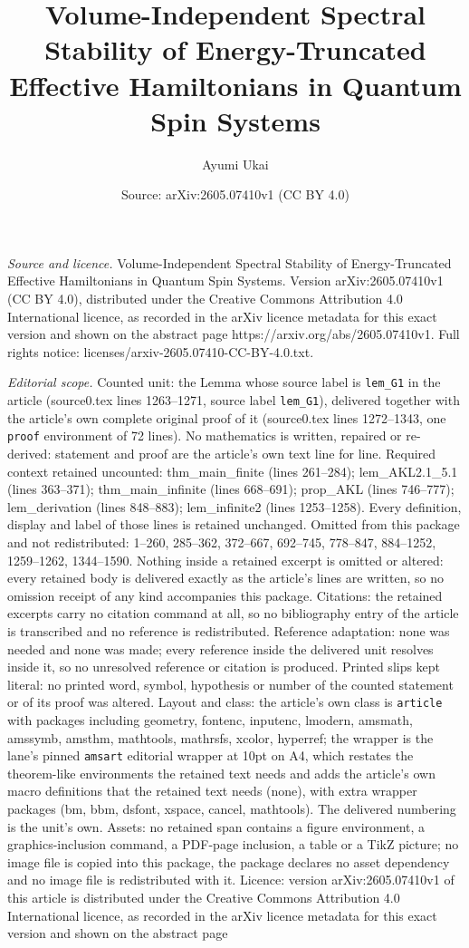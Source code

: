 \documentclass[10pt,a4paper]{amsart}
\title[Volume-Independent Spectral Stability of Energy-Truncated Ef]{Volume-Independent Spectral Stability of Energy-Truncated Effective Hamiltonians in Quantum Spin Systems}
\author{Ayumi Ukai}
\date{Source: arXiv:2605.07410v1 (CC BY 4.0)}
\begin{document}
\maketitle

\noindent\emph{Source and licence.} Volume-Independent Spectral Stability of Energy-Truncated Effective Hamiltonians in Quantum Spin Systems. Version arXiv:2605.07410v1 (CC BY 4.0), distributed under the Creative Commons Attribution 4.0 International licence, as recorded in the arXiv licence metadata for this exact version and shown on the abstract page https://arxiv.org/abs/2605.07410v1. Full rights notice: licenses/arxiv-2605.07410-CC-BY-4.0.txt.\par\smallskip

\noindent\textit{Editorial scope.} Counted unit: the Lemma whose source label is \texttt{lem\_G1} in the article (source0.tex lines 1263--1271, source label \texttt{lem\_G1}), delivered together with the article's own complete original proof of it (source0.tex lines 1272--1343, one \texttt{proof} environment of 72 lines). No mathematics is written, repaired or re-derived: statement and proof are the article's own text line for line. Required context retained uncounted: thm\_main\_finite (lines 261--284); lem\_AKL2.1\_5.1 (lines 363--371); thm\_main\_infinite (lines 668--691); prop\_AKL (lines 746--777); lem\_derivation (lines 848--883); lem\_infinite2 (lines 1253--1258). Every definition, display and label of those lines is retained unchanged. Omitted from this package and not redistributed: 1--260, 285--362, 372--667, 692--745, 778--847, 884--1252, 1259--1262, 1344--1590. Nothing inside a retained excerpt is omitted or altered: every retained body is delivered exactly as the article's lines are written, so no omission receipt of any kind accompanies this package. Citations: the retained excerpts carry no citation command at all, so no bibliography entry of the article is transcribed and no reference is redistributed. Reference adaptation: none was needed and none was made; every reference inside the delivered unit resolves inside it, so no unresolved reference or citation is produced. Printed slips kept literal: no printed word, symbol, hypothesis or number of the counted statement or of its proof was altered. Layout and class: the article's own class is \texttt{article} with packages including geometry, fontenc, inputenc, lmodern, amsmath, amssymb, amsthm, mathtools, mathrsfs, xcolor, hyperref; the wrapper is the lane's pinned \texttt{amsart} editorial wrapper at 10pt on A4, which restates the theorem-like environments the retained text needs and adds the article's own macro definitions that the retained text needs (none), with extra wrapper packages (bm, bbm, dsfont, xspace, cancel, mathtools). The delivered numbering is the unit's own. Assets: no retained span contains a figure environment, a graphics-inclusion command, a PDF-page inclusion, a table or a TikZ picture; no image file is copied into this package, the package declares no asset dependency and no image file is redistributed with it. Licence: version arXiv:2605.07410v1 of this article is distributed under the Creative Commons Attribution 4.0 International licence, as recorded in the arXiv licence metadata for this exact version and shown on the abstract page 
\end{document}
